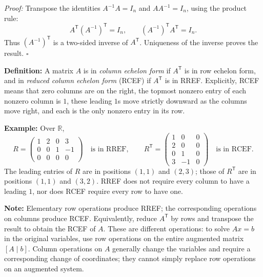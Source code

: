 \documentclass[a4paper,11pt,abstract=true]{scrartcl}
\theoremstyle{dotlessP}
\theoremstyle{dotlessS}
\theoremstyle{remark}
\theoremstyle{definition}
\begin{document}
\begin{claim_box}
\textit{Proof:} Transpose the identities $A^{-1}A=I_n$ and
$AA^{-1}=I_n$, using the product rule:
\[
A^{\mathsf{T}}{(A^{-1})}^{\mathsf{T}}=I_n,\qquad
{(A^{-1})}^{\mathsf{T}}A^{\mathsf{T}}=I_n.
\]
Thus ${(A^{-1})}^{\mathsf{T}}$ is a two-sided inverse of
$A^{\mathsf{T}}$. Uniqueness of the inverse proves the result.
\hfill$\square$
\end{claim_box}

\begin{claim_box}
\textbf{Definition:}
A matrix $A$ is in \emph{column echelon
form} if $A^{\mathsf{T}}$ is in row echelon form, and in
\emph{reduced column echelon form} (RCEF) if $A^{\mathsf{T}}$ is in RREF\@.
Explicitly, RCEF means that zero columns are on the right, the topmost
nonzero entry of each nonzero column is $1$, these leading $1$s move
strictly downward as the columns move right, and each is the only
nonzero entry in its row.
\end{claim_box}

\begin{example_box}
\textbf{Example:} Over $\mathbb{R}$,
\[
R=\begin{pmatrix}1&2&0&3\\0&0&1&-1\\0&0&0&0\end{pmatrix}
\quad\text{is in RREF},\qquad
R^{\mathsf{T}}=
\begin{pmatrix}1&0&0\\2&0&0\\0&1&0\\3&-1&0\end{pmatrix}
\quad\text{is in RCEF}.
\]
The leading entries of $R$ are in positions $(1,1)$ and $(2,3)$;
those of $R^{\mathsf{T}}$ are in positions $(1,1)$ and $(3,2)$.
RREF does not require every column to have a leading $1$, nor does
RCEF require every row to have one.
\end{example_box}

\begin{remark_box}
\textbf{Note:}
Elementary row operations produce RREF\@; the corresponding operations
on columns produce RCEF\@. Equivalently, reduce $A^{\mathsf{T}}$ by rows
and transpose the result to obtain the RCEF of $A$. These are different
operations: to solve $Ax=b$ in the original variables, use row
operations on the entire augmented matrix $[A\mid b]$. Column
operations on $A$ generally change the variables and require a
corresponding change of coordinates; they cannot simply replace row
operations on an augmented system.
\end{remark_box}
\end{document}
